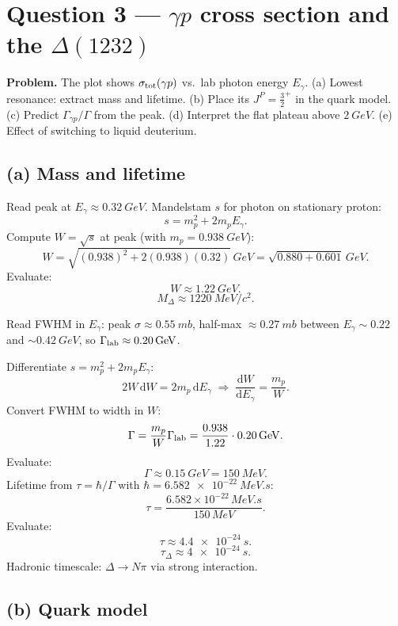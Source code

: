 \documentclass[11pt]{article}
\newcommand{\de}{\mathrm{d}}
\begin{document}
\section*{Question 3 --- $\gamma p$ cross section and the $\Delta(1232)$}

\textbf{Problem.} The plot shows $\sigma_{\rm tot}(\gamma p)$ vs.\ lab photon energy $E_\gamma$. (a) Lowest resonance: extract mass and lifetime. (b) Place its $J^{P}=\tfrac32^{+}$ in the quark model. (c) Predict $\Gamma_{\gamma p}/\Gamma$ from the peak. (d) Interpret the flat plateau above $\SI{2}{GeV}$. (e) Effect of switching to liquid deuterium.

\subsection*{(a) Mass and lifetime}

Read peak at $E_\gamma\approx \SI{0.32}{GeV}$. Mandelstam $s$ for photon on stationary proton:
\[
s=m_p^{2}+2m_p E_\gamma.
\]
Compute $W=\sqrt{s}$ at peak (with $m_p=\SI{0.938}{GeV}$):
\[
W=\sqrt{(0.938)^{2}+2(0.938)(0.32)}\,\si{GeV}=\sqrt{0.880+0.601}\,\si{GeV}.
\]
Evaluate:
\[
W\approx \SI{1.22}{GeV}.
\]
\begin{equation}
\boxed{\;M_\Delta\approx \SI{1220}{MeV}/c^{2}.\;}
\label{eq:MDelta}
\end{equation}

Read FWHM in $E_\gamma$: peak $\sigma\approx \SI{0.55}{mb}$, half-max $\approx \SI{0.27}{mb}$ between $E_\gamma\sim 0.22$ and $\sim\SI{0.42}{GeV}$, so $\Gamma_{\rm lab}\approx \SI{0.20}{GeV}$.

Differentiate $s=m_p^{2}+2m_pE_\gamma$:
\[
2W\,\de W=2m_p\,\de E_\gamma\;\Longrightarrow\;\frac{\de W}{\de E_\gamma}=\frac{m_p}{W}.
\]
Convert FWHM to width in $W$:
\[
\Gamma=\frac{m_p}{W}\Gamma_{\rm lab}=\frac{0.938}{1.22}\cdot 0.20\,\si{GeV}.
\]
Evaluate:
\[
\Gamma\approx \SI{0.15}{GeV}=\SI{150}{MeV}.
\]
Lifetime from $\tau=\hbar/\Gamma$ with $\hbar=\SI{6.582e-22}{MeV.s}$:
\[
\tau=\frac{6.582\times 10^{-22}\,\si{MeV.s}}{150\,\si{MeV}}.
\]
Evaluate:
\[
\tau\approx \SI{4.4e-24}{s}.
\]
\begin{equation}
\boxed{\;\tau_\Delta\approx \SI{4e-24}{s}.\;}
\label{eq:tauDelta}
\end{equation}
Hadronic timescale: $\Delta\to N\pi$ via strong interaction.

\subsection*{(b) Quark model}
\end{document}
